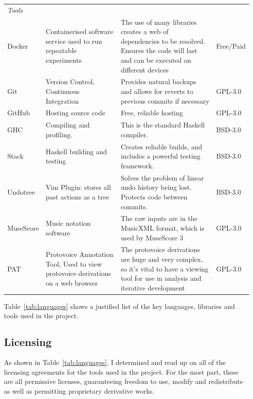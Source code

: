 \documentclass[12pt,a4paper,twoside,openright]{report}
\theoremstyle{definition}
\begin{document}
\begin{table}[h]
\begin{tabularx}{\textwidth}{p{4em}X X p{4em}}
    \textit{Tools} &&&\\
    Docker & Containerised software service used to run repeatable experiments 
           & The use of many libraries creates a web of dependencies to be resolved. Ensures the code will last and can be executed on different devices 
           & Free/Paid \\
    Git & Version Control, Continuous Integration 
        & Provides natural backups and allows for reverts to previous commits if necessary
        & GPL-3.0 \\
    GitHub & Hosting source code
           & Free, reliable hosting
           & GPL-3.0 \\
    GHC & Compiling and profiling.
        & This is the standard Haskell compiler. 
        & BSD-3.0 \\
    Stack & Haskell building and testing  
        & Creates reliable builds, and includes a powerful testing framework.
        & BSD-3.0 \\
    Undotree & Vim Plugin: stores all past actions as a tree 
        & Solves the problem of linear undo history being lost. Protects code between commits. 
        & BSD-3.0 \\
    MuseScore & Music notation software 
                & The raw inputs are in the MusicXML format, which is used by MuseScore 3
                & GPL-3.0 \\
    PAT & Protovoice Annotation Tool, Used to view protovoice derivations on a web browser 
          & The protovoice derivations are huge and very complex, so it's vital to have a viewing tool for use in analysis and iterative development
        & GPL-3.0 \\
  \end{tabularx}
\end{table}

Table~\ref{tab:languages} shows a justified list of the key languages, libraries and tools used in the project.

\FloatBarrier
\subsection{Licensing}

As shown in Table~\ref{tab:languages}, I determined and read up on all of the licensing agreements for the tools used in the project. For the most part, these are all permissive licenses, guaranteeing freedom to use, modify and redistribute as well as permitting proprietary derivative works. 
\end{document}

